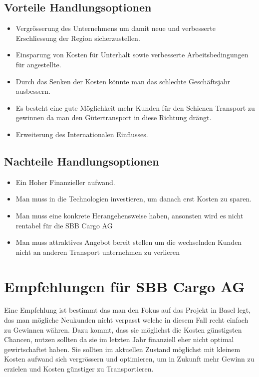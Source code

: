 \documentclass{article}
\begin{document}
\subsection{Vorteile Handlungsoptionen}
\begin{itemize}
    \item Vergrösserung des Unternehmens um damit neue und verbesserte Erschliessung der Region sicherzustellen. 
    \item Einsparung von Kosten für Unterhalt sowie verbesserte Arbeitsbedingungen für angestellte. 
    \item Durch das Senken der Kosten könnte man das schlechte Geschäftsjahr ausbessern. 
    \item Es besteht eine gute Möglichkeit mehr Kunden für den Schienen Transport zu gewinnen da man den Gütertransport in diese Richtung drängt. 
    \item Erweiterung des Internationalen Einflusses. 
\end{itemize}

\subsection{Nachteile Handlungsoptionen}
\begin{itemize}
    \item Ein Hoher Finanzieller aufwand.
    \item Man muss in die Technologien investieren, um danach erst Kosten zu sparen. 
    \item Man muss eine konkrete Herangehensweise haben, ansonsten wird es nicht rentabel für die SBB Cargo AG 
    \item Man muss attraktives Angebot bereit stellen um die wechselnden Kunden nicht an anderen Transport unternehmen zu verlieren 
\end{itemize}

\section{Empfehlungen für SBB Cargo AG}

Eine Empfehlung ist bestimmt das man den Fokus auf das Projekt in Basel legt, das man mögliche Neukunden nicht verpasst welche in diesem Fall recht einfach zu Gewinnen währen.
Dazu kommt, dass sie möglichst die Kosten günstigsten Chancen, nutzen sollten da sie im letzten Jahr finanziell eher nicht optimal gewirtschaftet haben.
Sie sollten im aktuellen Zustand möglichst mit kleinem Kosten aufwand sich vergrössern und optimieren, um in Zukunft mehr Gewinn zu erzielen und Kosten günstiger zu Transportieren. 
\end{document}
